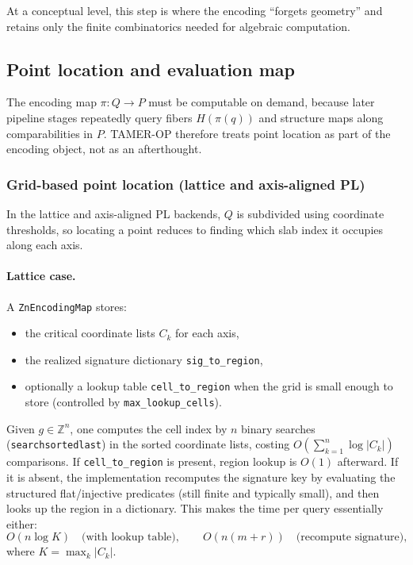 \documentclass{article}
\newcommand{\<}{\langle}
\renewcommand{\>}{\rangle}
\theoremstyle{definition}
\theoremstyle{remark}
\begin{document}
	At a conceptual level, this step is where the encoding ``forgets geometry'' and
	retains only the finite combinatorics needed for algebraic computation.
	
	\subsection{Point location and evaluation map}
	\label{subsec:point-location}
	
	The encoding map $\pi\colon Q\to P$ must be computable on demand, because later
	pipeline stages repeatedly query fibers $H(\pi(q))$ and structure maps along
	comparabilities in $P$.  TAMER-OP therefore treats point location as part of the
	encoding object, not as an afterthought.
	
	\subsubsection*{Grid-based point location (lattice and axis-aligned PL)}
	
	In the lattice and axis-aligned PL backends, $Q$ is subdivided using coordinate
	thresholds, so locating a point reduces to finding which slab index it occupies
	along each axis.
	
	\paragraph{Lattice case.}
	A \texttt{ZnEncodingMap} stores:
	\begin{itemize}
		\item the critical coordinate lists $C_k$ for each axis,
		\item the realized signature dictionary \texttt{sig\_to\_region},
		\item optionally a lookup table \texttt{cell\_to\_region} when the grid is small
		enough to store (controlled by \texttt{max\_lookup\_cells}).
	\end{itemize}
	Given $g\in \mathbb{Z}^n$, one computes the cell index by $n$ binary searches
	(\texttt{searchsortedlast}) in the sorted coordinate lists, costing
	$O\!\left(\sum_{k=1}^n \log |C_k|\right)$ comparisons.
	If \texttt{cell\_to\_region} is present, region lookup is $O(1)$ afterward.
	If it is absent, the implementation recomputes the signature key by evaluating the
	structured flat/injective predicates (still finite and typically small), and then
	looks up the region in a dictionary.  This makes the time per query essentially
	either:
	\[
	O\!\left(n\log K\right)\quad\text{(with lookup table)},\qquad
	O\!\left(n(m+r)\right)\quad\text{(recompute signature)},
	\]
	where $K=\max_k |C_k|$.
	
\end{document}
